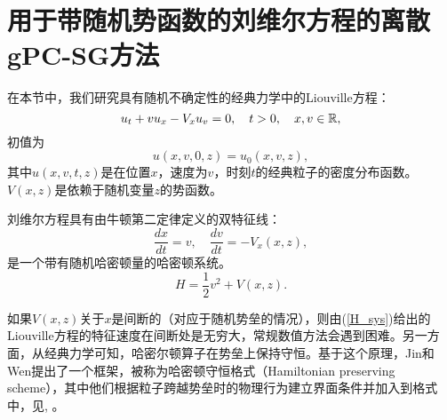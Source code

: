 \section{用于带随机势函数的刘维尔方程的离散gPC-SG方法}\label{c2-3}
在本节中，我们研究具有随机不确定性的经典力学中的Liouville方程：
\begin{equation}\label{eq_Liouville}
  u_t + v  u_x - V_x  u_v = 0, \quad t>0, \quad x, v \in {\mathbb{R}},
\end{equation}
初值为
\begin{equation}
  u(x, v, 0, z) = u_0(x, v, z),
\end{equation}
其中$u(x, v, t, z)$是在位置$x$，速度为$v$，时刻$t$的经典粒子的密度分布函数。$V(x, z)$是依赖于随机变量$z$的势函数。

刘维尔方程具有由牛顿第二定律定义的双特征线：
\begin{equation}\label{H_sys}
    \frac{dx}{dt}=v, \quad \frac{dv}{dt} = -V_x(x, z),
\end{equation}
是一个带有随机哈密顿量的哈密顿系统。
\begin{equation}
    H = \frac{1}{2} v^2 + V(x,z).
\end{equation}

如果$V(x, z)$关于$x$是间断的（对应于随机势垒的情况），则由(\ref{H_sys})给出的Liouville方程的特征速度在间断处是无穷大，常规数值方法会遇到困难。另一方面，从经典力学可知，哈密尔顿算子在势垒上保持守恒。基于这个原理，Jin和Wen提出了一个框架，被称为哈密顿守恒格式（Hamiltonian preserving scheme），其中他们根据粒子跨越势垒时的物理行为建立界面条件并加入到格式中，见, 。

